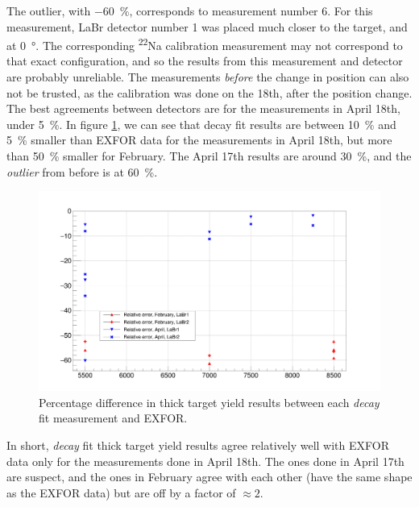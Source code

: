 \documentclass[a4paper,12pt]{report}
\newcommand{\Na}{\textsuperscript{22}Na }
\begin{document}
The outlier, with \qty{-60}{\percent}, corresponds to measurement number 6.
For this measurement, LaBr detector number 1 was placed much closer to the target, and at \qty{0}{\degree}.
The corresponding \Na calibration measurement may not correspond to that exact configuration, and so the results from this measurement and detector are probably unreliable.
The measurements \emph{before} the change in position can also not be trusted, as the calibration was done on the 18th, after the position change.
\\

The best agreements between detectors are for the measurements in April 18th, under \qty{5}{\percent}.
In figure \ref{decay_errors_per}, we can see that decay fit results are between \qty{10}{\percent} and \qty{5}{\percent} smaller than EXFOR data for the measurements in April 18th, but more than \qty{50}{\percent} smaller for February.
The April 17th results are around \qty{30}{\percent}, and the \textit{outlier} from before is at \qty{60}{\percent}.

\begin{figure}[H]
	\centering
	\includegraphics[width=\textwidth]{decay_errors_per.png}
	\caption{Percentage difference in thick target yield results between each \textit{decay} fit measurement and EXFOR.}
	\label{decay_errors_per}
\end{figure}

In short, \textit{decay} fit thick target yield results agree relatively well with EXFOR data only for the measurements done in April 18th.
The ones done in April 17th are suspect, and the ones in February agree with each other (have the same shape as the EXFOR data) but are off by a factor of $\approx 2$.
\end{document}
